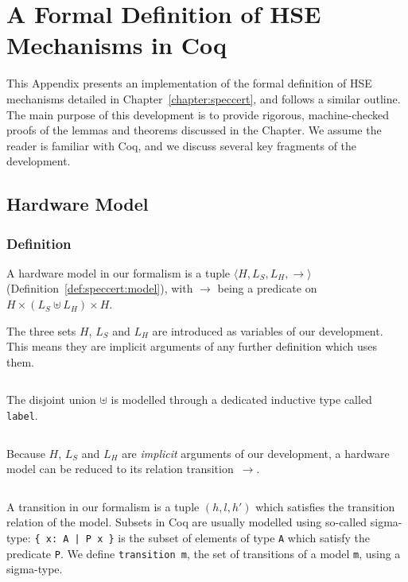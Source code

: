 \chapter{A Formal Definition of HSE Mechanisms in Coq}
\label{appendix:speccert}

This Appendix presents an implementation of the formal definition of HSE
mechanisms detailed in Chapter~\ref{chapter:speccert}, and follows a similar
outline.
%
The main purpose of this development is to provide rigorous, machine-checked
proofs of the lemmas and theorems discussed in the Chapter.
%
We assume the reader is familiar with Coq, and we discuss several key fragments
of the development.

\section{Hardware Model}

\subsection{Definition}

A hardware model in our formalism is a tuple
$\langle H, L_S, L_H, \rightarrow \rangle$
(Definition~\ref{def:speccert:model}), with $\rightarrow$ being a predicate on
$H \times (L_S \uplus L_H) \times H$.

The three sets $H$, $L_S$ and $L_H$ are introduced as variables of our
development.
%
This means they are implicit arguments of any further definition which uses
them.

\inputminted[gobble=2,firstline=2,lastline=2]{coq}{Listings/SpecCert.v}

The disjoint union $\uplus$ is modelled through a dedicated inductive type
called \texttt{label}.

\inputminted[gobble=2,firstline=4,lastline=8]{coq}{Listings/SpecCert.v}

Because $H$, $L_S$ and $L_H$ are \emph{implicit} arguments of our development, a
hardware model can be reduced to its relation transition~$\rightarrow$.

\inputminted[gobble=2,firstline=10,lastline=12]{coq}{Listings/SpecCert.v}

A transition in our formalism is a tuple $(h, l, h')$ which satisfies the
transition relation of the model.
%
Subsets in Coq are usually modelled using so-called sigma-type:
%
\texttt{\{ x: A | P x \}} is the subset of elements of type \texttt{A} which
satisfy the predicate \texttt{P}.
%
We define \texttt{transition m}, the set of transitions of a model \texttt{m},
using a sigma-type.

